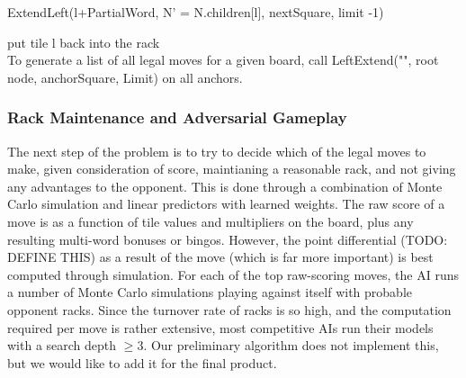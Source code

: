 \documentclass[12pt]{article}
\begin{document}
\quad\quad\quad\quad ExtendLeft(l+PartialWord, N' =
N.children[l], nextSquare, limit -1)

\quad\quad\quad\quad put tile l back into the rack\\
			
To generate a list of all legal moves for a given board, call
LeftExtend("", root node, anchorSquare, Limit) on all anchors.




\subsubsection{Rack Maintenance and Adversarial Gameplay}
The next step of the problem is to try to decide which of the legal
moves to make, given consideration of score, maintianing a reasonable
rack, and not giving any advantages to the opponent. This is done
through a combination of Monte Carlo simulation and linear predictors
with learned weights. The raw score of a move is as a function of tile
values and multipliers on the board, plus any resulting multi-word
bonuses or bingos. However, the point differential (TODO: DEFINE THIS)
as a result of the move (which is far more important) is best computed
through simulation. For each of the top raw-scoring moves, the AI runs
a number of Monte Carlo simulations playing against itself with
probable opponent racks. Since the turnover rate of racks is so high,
and the computation required per move is rather extensive, most
competitive AIs run their models with a search depth $\geq 3$. Our
preliminary algorithm does not implement this, but we would like to
add it for the final product.
\end{document}
